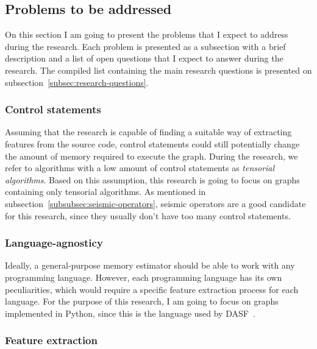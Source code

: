 
\subsection{Problems to be addressed}
\label{subsec:problems-to-be-addressed}

On this section I am going to present the problems that I expect to address during the research.
Each problem is presented as a subsection with a brief description and a list of open questions that I expect to answer during the research.
The compiled list containing the main research questions is presented on subsection~\ref{subsec:research-questions}.

\subsubsection{Control statements}

Assuming that the research is capable of finding a suitable way of extracting features from the source code, control statements could still potentially change the amount of memory required to execute the graph.
During the research, we refer to algorithms with a low amount of control statements as \textit{tensorial algorithms}.
Based on this assumption, this research is going to focus on graphs containing only tensorial algorithms.
As mentioned in subsection~\ref{subsubsec:seismic-operators}, seismic operators are a good candidate for this research, since they usually don't have too many control statements.

\subsubsection{Language-agnosticy}
\label{subsubsec:language-agnosticy}

Ideally, a general-purpose memory estimator should be able to work with any programming language.
However, each programming language has its own peculiarities, which would require a specific feature extraction process for each language.
For the purpose of this research, I am going to focus on graphs implemented in Python, since this is the language used by DASF~\cite{dasf}.

\subsubsection{Feature extraction}

